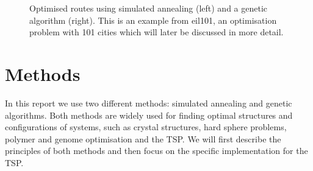 \documentclass[10pt,a4paper]{article}
\begin{document}
\begin{figure}[H]
  \caption{Optimised routes using simulated annealing (left) and a genetic algorithm (right). This is an example from eil101, an optimisation problem with 101 cities which will later be discussed in more detail. }
  \label{fig:example}
\end{figure}

\section{Methods}
In this report we use two different methods: simulated annealing and genetic algorithms. Both methods are widely used for finding optimal structures and configurations of systems, such as crystal structures, hard sphere problems, polymer and genome optimisation and the TSP. We will first describe the principles of both methods and then focus on the specific implementation for the TSP.
\end{document}
